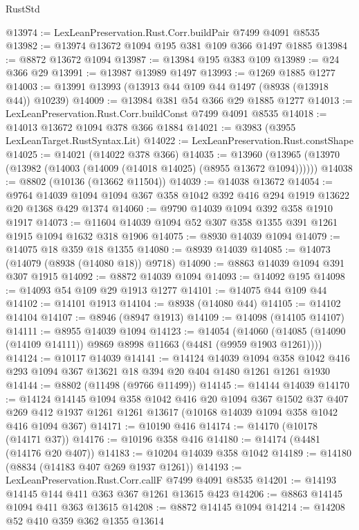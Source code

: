 \begin{lexlean}{RustStd}
\begin{coremodule}
@13974 := LexLeanPreservation.Rust.Corr.buildPair @7499 @4091 @8535
@13982 := @13974 @13672 @1094 @195 @381 @109 @366 @1497 @1885
@13984 := @8872 @13672 @1094
@13987 := @13984 @195 @383 @109
@13989 := @24 @366 @29
@13991 := @13987 @13989 @1497
@13993 := @1269 @1885 @1277
@14003 := @13991 @13993 (@13913 @44 @109 @44 @1497 (@8938 (@13918 @44)) @10239)
@14009 := @13984 @381 @54 @366 @29 @1885 @1277
@14013 := LexLeanPreservation.Rust.Corr.buildConst @7499 @4091 @8535
@14018 := @14013 @13672 @1094 @378 @366 @1884
@14021 := @3983 (@3955 LexLeanTarget.RustSyntax.Lit)
@14022 := LexLeanPreservation.Rust.constShape
@14025 := @14021 (@14022 @378 @366)
@14035 := @13960 (@13965 (@13970 (@13982 (@14003 (@14009 (@14018 @14025) (@8955 @13672 @1094))))))
@14038 := @8802 (@10136 (@13662 @11504))
@14039 := @14038 @13672
@14054 := @9764 @14039 @1094 @1094 @367 @358 @1042 @392 @416 @294 @1919 @13622 @20 @1368 @429 @1374
@14060 := @9790 @14039 @1094 @392 @358 @1910 @1917
@14073 := @11604 @14039 @1094 @52 @307 @358 @1355 @391 @1261 @1915 @1094 @1632 @318 @1906
@14075 := @8930 @14039 @1094
@14079 := @14075 @18 @359 @18 @1355
@14080 := @8939 @14039
@14085 := @14073 (@14079 (@8938 (@14080 @18)) @9718)
@14090 := @8863 @14039 @1094 @391 @307 @1915
@14092 := @8872 @14039 @1094
@14093 := @14092 @195
@14098 := @14093 @54 @109 @29 @1913 @1277
@14101 := @14075 @44 @109 @44
@14102 := @14101 @1913
@14104 := @8938 (@14080 @44)
@14105 := @14102 @14104
@14107 := @8946 (@8947 @1913)
@14109 := @14098 (@14105 @14107)
@14111 := @8955 @14039 @1094
@14123 := @14054
    (@14060 (@14085 (@14090 (@14109 @14111)) @9869 @8998 @11663 (@4481 (@9959 @1903 @1261))))
@14124 := @10117 @14039
@14141 := @14124
    @14039
    @1094
    @358
    @1042
    @416
    @293
    @1094
    @367
    @13621
    @18
    @394
    @20
    @404
    @1480
    @1261
    @1261
    @1930
@14144 := @8802 (@11498 (@9766 @11499))
@14145 := @14144 @14039
@14170 := @14124
    @14145
    @1094
    @358
    @1042
    @416
    @20
    @1094
    @367
    @1502
    @37
    @407
    @269
    @412
    @1937
    @1261
    @1261
    @13617
    (@10168 @14039 @1094 @358 @1042 @416 @1094 @367)
@14171 := @10190 @416
@14174 := @14170 (@10178 (@14171 @37))
@14176 := @10196 @358 @416
@14180 := @14174 (@4481 (@14176 @20 @407))
@14183 := @10204 @14039 @358 @1042
@14189 := @14180 (@8834 (@14183 @407 @269 @1937 @1261))
@14193 := LexLeanPreservation.Rust.Corr.callF @7499 @4091 @8535
@14201 := @14193 @14145 @144 @411 @363 @367 @1261 @13615 @423
@14206 := @8863 @14145 @1094 @411 @363 @13615
@14208 := @8872 @14145 @1094
@14214 := @14208 @52 @410 @359 @362 @1355 @13614

\end{coremodule}
\end{lexlean}
